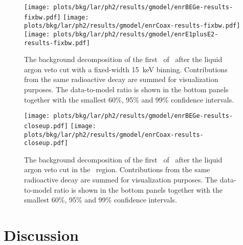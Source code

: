 \begin{figure}
  \centering
  \texttt{[image: plots/bkg/lar/ph2/results/gmodel/enrBEGe-results-fixbw.pdf]}
  \texttt{[image: plots/bkg/lar/ph2/results/gmodel/enrCoax-results-fixbw.pdf]}
  \texttt{[image: plots/bkg/lar/ph2/results/gmodel/enrE1plusE2-results-fixbw.pdf]}
  \caption{%
    The background decomposition of the first \gexpophasetwobkg\ of \gerdatwo\ after the
    liquid argon veto cut with a fixed-width 15~keV binning. Contributions from the same
    radioactive decay are summed for visualization purposes. The data-to-model ratio is
    shown in the bottom panels together with the smallest 60\%, 95\% and 99\% confidence
    intervals.
  }\label{fig:bkg:lar:ph2:results-fixbw}
\end{figure}

\begin{figure}
  \centering
  \texttt{[image: plots/bkg/lar/ph2/results/gmodel/enrBEGe-results-closeup.pdf]}
  \texttt{[image: plots/bkg/lar/ph2/results/gmodel/enrCoax-results-closeup.pdf]}
  \caption{%
    The background decomposition of the first \gexpophasetwobkg\ of \gerdatwo\ after the
    liquid argon veto cut in the \nnbb\ region. Contributions from the same radioactive
    decay are summed for visualization purposes. The data-to-model ratio is shown in the
    bottom panels together with the smallest 60\%, 95\% and 99\% confidence intervals.
  }\label{fig:bkg:lar:ph2:results-closeup}
\end{figure}

\section{Discussion}%
\label{sec:bkg:lar:ph2:discussion}


